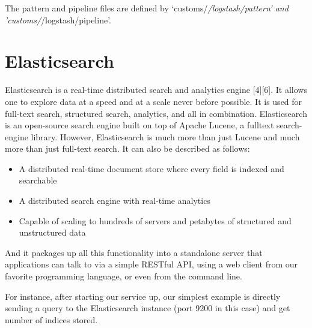 \documentclass[]{article}
\begin{document}
The pattern and pipeline files are defined by
`customs/\emph{/logstash/pattern' and 'customs/}/logstash/pipeline'.

\section{Elasticsearch}\label{elasticsearch}

Elasticsearch is a real-time distributed search and analytics engine
{[}4{]}{[}6{]}. It allows one to explore data at a speed and at a scale
never before possible. It is used for full-text search, structured
search, analytics, and all in combination. Elasticsearch is an
open-source search engine built on top of Apache Lucene, a fulltext
search-engine library. However, Elasticsearch is much more than just
Lucene and much more than just full-text search. It can also be
described as follows:

\begin{itemize}
\itemsep1pt\parskip0pt
\item
  A distributed real-time document store where every field is indexed
  and searchable
\item
  A distributed search engine with real-time analytics
\item
  Capable of scaling to hundreds of servers and petabytes of structured
  and unstructured data
\end{itemize}

And it packages up all this functionality into a standalone server that
applications can talk to via a simple RESTful API, using a web client
from our favorite programming language, or even from the command line.

For instance, after starting our service up, our simplest example is
directly sending a query to the Elasticsearch instance (port 9200 in
this case) and get number of indices stored.
\end{document}
